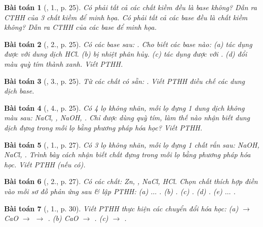 \documentclass{article}
\newtheorem{baitoan}{Bài toán}
\begin{document}
\begin{baitoan}[\cite{SGK_Hoa_Hoc_9}, 1., p. 25]
	Có phải tất cả các chất kiềm đều là base không? Dẫn ra CTHH của 3 chất kiềm để minh họa. Có phải tất cả các base đều là chất kiềm không? Dẫn ra CTHH của các base để minh họa.
\end{baitoan}

\begin{baitoan}[\cite{SGK_Hoa_Hoc_9}, 2., p. 25]
	Có các base sau: {\rm{}}. Cho biết các base nào: (a) tác dụng được với dung dịch {\rm HCl}. (b) bị nhiệt phân hủy. (c) tác dụng được với {\rm{}}. (d) đổi màu quỳ tím thành xanh. Viết {\rm PTHH}.
\end{baitoan}

\begin{baitoan}[\cite{SGK_Hoa_Hoc_9}, 3., p. 25]
	Từ các chất có sẵn: {\rm{}}. Viết {\rm PTHH} điều chế các dung dịch base.
\end{baitoan}

\begin{baitoan}[\cite{SGK_Hoa_Hoc_9}, 4., p. 25]
	Có 4 lọ không nhãn, mỗi lọ đựng 1 dung dịch không màu sau: {\rm NaCl, , NaOH, }. Chỉ được dùng quỳ tím, làm thế nào nhận biết dung dịch đựng trong mỗi lọ bằng phương pháp hóa học? Viết {\rm PTHH}.
\end{baitoan}

\begin{baitoan}[\cite{SGK_Hoa_Hoc_9}, 1., p. 27]
	Có 3 lọ không nhãn, mỗi lọ đựng 1 chất rắn sau: {\rm NaOH, NaCl, }. Trình bày cách nhận biết chất đựng trong mỗi lọ bằng phương pháp hóa học. Viết {\rm PTHH} (nếu có).
\end{baitoan}

\begin{baitoan}[\cite{SGK_Hoa_Hoc_9}, 2., p. 27]
	Có các chất: {\rm Zn, , NaCl, HCl}. Chọn chất thích hợp điền vào mỗi sơ đồ phản ứng sau \& lập PTHH: {\rm(a) $\ldots$ . (b) . (c) . (d) . (e) $\ldots$ }.
\end{baitoan}

\begin{baitoan}[\cite{SGK_Hoa_Hoc_9}, 1., p. 30]
	Viết {\rm PTHH} thực hiện các chuyển đổi hóa học: (a) {\rm{} $\to$ CaO $\to$  $\to$ }. (b) {\rm CaO $\to$ }. (c) {\rm{} $\to$ }.
\end{baitoan}
\end{document}
